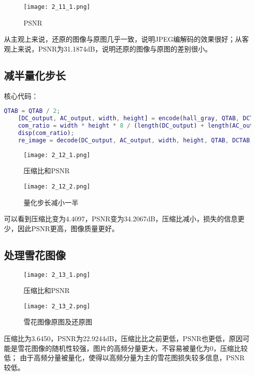 \documentclass[12pt]{article}
\begin{document}
\begin{figure}[H]
    \centering
    \texttt{[image: 2\_11\_1.png]}
    \caption{PSNR}
\end{figure}

从主观上来说，还原的图像与原图几乎一致，说明JPEG编解码的效果很好；从客观上来说，PSNR为31.1874dB，说明还原的图像与原图的差别很小。

\subsection{减半量化步长}

核心代码：
\begin{lstlisting}[language=matlab]
    QTAB = QTAB / 2;
    [DC_output, AC_output, width, height] = encode(hall_gray, QTAB, DCTAB, ACTAB);
    com_ratio = width * height * 8 / (length(DC_output) + length(AC_output));
    disp(com_ratio);
    re_image = decode(DC_output, AC_output, width, height, QTAB, DCTAB, ACTAB);
\end{lstlisting}

\begin{figure}[H]
    \centering
    \texttt{[image: 2\_12\_1.png]}
    \caption{压缩比和PSNR}
\end{figure}

\begin{figure}[H]
    \centering
    \texttt{[image: 2\_12\_2.png]}
    \caption{量化步长减小一半}
\end{figure}

可以看到压缩比变为4.4097，PSNR变为34.2067dB，压缩比减小，损失的信息更少，因此PSNR更高，图像质量更好。

\subsection{处理雪花图像}
\begin{figure}[H]
    \centering
    \texttt{[image: 2\_13\_1.png]}
    \caption{压缩比和PSNR}
\end{figure}

\begin{figure}[H]
    \centering
    \texttt{[image: 2\_13\_2.png]}
    \caption{雪花图像原图及还原图}
\end{figure}

压缩比为3.6450，PSNR为22.9244dB，压缩比比之前更低，PSNR也更低，原因可能是雪花图像的随机性较强，图片的高频分量更大，不容易被量化为0，压缩比较低；
由于高频分量被量化，使得以高频分量为主的雪花图损失较多信息，PSNR较低。
\end{document}

